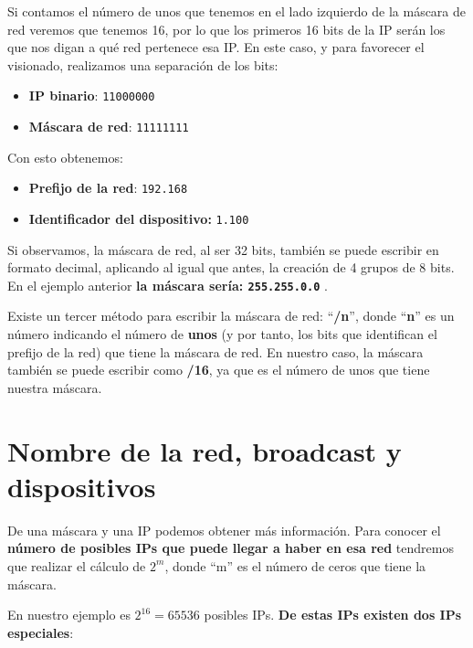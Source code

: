 Si contamos el número de unos que tenemos en el lado izquierdo de la máscara de red veremos que tenemos 16, por lo que los primeros 16 bits de la IP serán los que nos digan a qué red pertenece esa IP. En este caso, y para favorecer el visionado, realizamos una separación de los bits:

\begin{itemize}
    \item \textbf{IP binario}:\hspace{25pt} \texttt{11000000\space{}\space{}\space{}}
    \item \textbf{Máscara de red}: \texttt{11111111\space{}\space{}\space{}}
\end{itemize}

Con esto obtenemos:
\begin{itemize}
    \item \textbf{Prefijo de la red}: \texttt{192.168}
    \item \textbf{Identificador del dispositivo:} \texttt{1.100}
\end{itemize}

Si observamos, la máscara de red, al ser 32 bits, también se puede escribir en formato decimal, aplicando al igual que antes, la creación de 4 grupos de 8 bits. En el ejemplo anterior \textbf{la máscara sería: \texttt{255.255.0.0}} .

Existe un tercer método para escribir la máscara de red:  “\textbf{/n}”, donde “\textbf{n}” es un número indicando el número de \textbf{unos} (y por tanto, los bits que identifican el prefijo de la red) que tiene la máscara de red. En nuestro caso, la máscara también se puede escribir como \textbf{/16}, ya que es el número de unos que tiene nuestra máscara.

\section{Nombre de la red, broadcast y dispositivos}

De una máscara y una IP podemos obtener más información. Para conocer el \textbf{número de posibles IPs que puede llegar a haber en esa red} tendremos que realizar el cálculo de $2^{m}$, donde “m” es el número de ceros que tiene la máscara.

En nuestro ejemplo es $2^{16} = 65536$ posibles IPs. \textbf{De estas IPs existen dos IPs especiales}:

